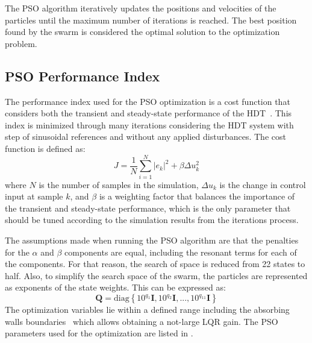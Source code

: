 The PSO algorithm iteratively updates the positions and velocities of the particles until the maximum number of iterations is reached. The best position found by the swarm is considered the optimal solution to the optimization problem.

\subsection{PSO Performance Index}

The performance index used for the PSO optimization is a cost function that considers both the transient and steady-state performance of the HDT~\cite{ufnalskiParticleSwarmOptimization2015}. This index is minimized through many iterations considering the HDT system with step of sinusoidal references and without any applied disturbances. The cost function is defined as:
\begin{equation}
    J = \dfrac{1}{N} \sum_{i=1}^{N} |e_k|^2 + \beta \Delta u_k^2
\end{equation}
where $N$ is the number of samples in the simulation, $\Delta u_k$ is the change in control input at sample $k$, and $\beta$ is a weighting factor that balances the importance of the transient and steady-state performance, which is the only parameter that should be tuned according to the simulation results from the iterations process.

The assumptions made when running the PSO algorithm are that the penalties for the $\alpha$ and $\beta$ components are equal, including the resonant terms for each of the components. For that reason, the search of space is reduced from 22 states to half. Also, to simplify the search space of the swarm, the particles are represented as exponents of the state weights. This can be expressed as:
\begin{equation}
    \mathbf{Q} = \text{diag}\left\{10^{q_1}\mathbf{I}, 10^{q_2}\mathbf{I}, ..., 10^{q_{11}}\mathbf{I}\right\}
\end{equation}
The optimization variables lie within a defined range including the absorbing walls boundaries~\cite{robinsonParticleSwarmOptimization2004} which allows obtaining a not-large LQR gain. The PSO parameters used for the optimization are listed in .

